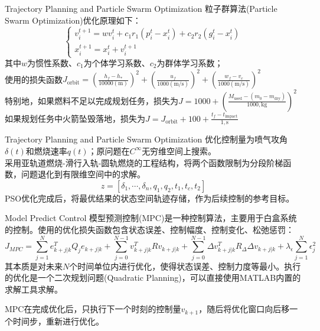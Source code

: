 \documentclass[aspectratio=169]{beamer} %
\begin{document}
	\begin{frame}{Trajectory Planning and Particle Swarm Optimization}
		粒子群算法(Particle Swarm Optimization)优化原理如下：
		$$
		\begin{cases}
			v_i^{t+1} = w v_i^t + c_1r_1(p^t_i-x^t_i) + c_2r_2(g^t_i-x^t_i) \\
			x_i^{t+1} = x_i^t + v_i^{t+1}
		\end{cases}
		$$
		其中$w$为惯性系数、$c_1$为个体学习系数、$c_2$为群体学习系数；\\
		使用的损失函数$J_{\mathrm{orbit}}=\left(\frac{h_f-h_*}{10000(\mathrm m)}\right)^2+\left(\frac{u_f}{1000(\mathrm{m/s})}\right)^2+\left(\frac{w_f-v_c}{1000(\mathrm{m/s})}\right)^2$\\
		特别地，如果燃料不足以完成规划任务，损失为$J=1000+\left(\frac{M_{\mathrm{used}}-(m_0-m_{\mathrm{dry}})}{1000,\mathrm{kg}}\right)^2$\\
		如果规划任务中火箭坠毁落地，损失为$J=J_{\mathrm{orbit}}+100+\frac{t_f-t_{\mathrm{impact}}}{1,\mathrm s}$
		
	\end{frame}
	
	\begin{frame}{Trajectory Planning and Particle Swarm Optimization}
		优化控制量为喷气攻角$\delta(t)$和燃烧速率$q(t)$；原问题在$C^{\infty}$无穷维空间上搜索。\\
		采用亚轨道燃烧-滑行入轨-圆轨燃烧的工程结构，将两个函数限制为分段阶梯函数，问题退化到有限维空间中的求解。
		$$
		z = [\delta_1, \cdots, \delta_n, q_1, q_2, t_1, t_c, t_2]
		$$
		PSO优化完成后，将最优结果的状态空间轨迹存储，作为后续控制的参考目标。
	\end{frame}
	
	\begin{frame}{Model Predict Control}
		模型预测控制(MPC)是一种控制算法，主要用于白盒系统的控制。使用的优化损失函数包含状态误差、控制幅度、控制变化、松弛惩罚：
		$$
		J_{MPC} = \sum_{j=1}^N e_{k+j|k}^T Q_j e_{k+j|k} + \sum_{j=0}^{N-1} v_{k+j|k}^T R v_{k+j|k} + \sum_{j=0}^{N-1} \Delta v_{k+j|k}^T R_{\Delta} \Delta v_{k+j|k} + \lambda_\epsilon \sum_{j=1}^{N} \epsilon_j^2
		$$
		其本质是对未来$N$个时间单位内进行优化，使得状态误差、控制力度等最小。执行的优化是一个二次规划问题(Quadratic Planning)，可以直接使用MATLAB内置的求解工具求解。
		
		MPC在完成优化后，只执行下一个时刻的控制量$v_{k+1}$，随后将优化窗口向后移一个时间步，重新进行优化。
		   
	\end{frame}
	
\end{document}
